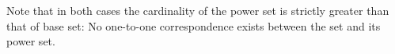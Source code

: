 \documentclass[]{report}
\begin{document}
Note that in both cases the cardinality of the power set is strictly greater than that of base set: No one-to-one correspondence exists between the set and its power set. 





\end{document}
